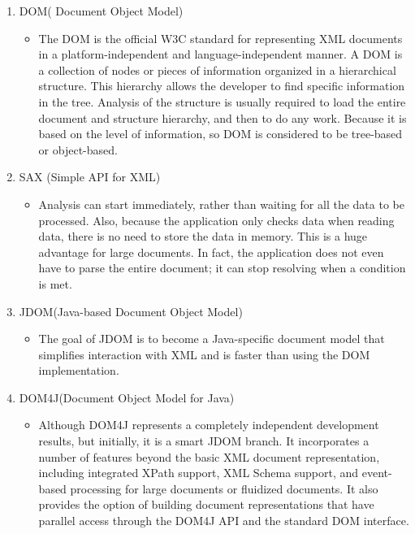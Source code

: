 \begin{enumerate}
    \item DOM( Document Object Model)
    \begin{itemize}
        \item {
          The DOM is the official W3C standard for representing XML documents in a platform-independent and language-independent manner.
          A DOM is a collection of nodes or pieces of information organized in a hierarchical structure.
          This hierarchy allows the developer to find specific information in the tree.
          Analysis of the structure is usually required to load the entire document and structure hierarchy, and then to do any work.
          Because it is based on the level of information, so DOM is considered to be tree-based or object-based.
        }
    \end{itemize}
    \item SAX (Simple API for XML)
    \begin{itemize}
        \item {
          Analysis can start immediately, rather than waiting for all the data to be processed.
          Also, because the application only checks data when reading data, there is no need to store the data in memory.
          This is a huge advantage for large documents.
          In fact, the application does not even have to parse the entire document; it can stop resolving when a condition is met.
        }
    \end{itemize}
    \item JDOM(Java-based Document Object Model)
    \begin{itemize}
        \item The goal of JDOM is to become a Java-specific document model that simplifies interaction with XML and is faster than using the DOM implementation.
    \end{itemize}
    \item DOM4J(Document Object Model for Java)
    \begin{itemize}
        \item {
          Although DOM4J represents a completely independent development results, but initially, it is a smart JDOM branch.
          It incorporates a number of features beyond the basic XML document representation, including integrated XPath support, XML Schema support, and event-based processing for large documents or fluidized documents.
          It also provides the option of building document representations that have parallel access through the DOM4J API and the standard DOM interface.
        }
    \end{itemize}
\end{enumerate}

